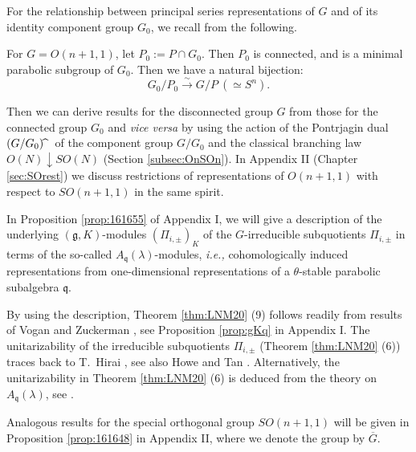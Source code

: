 For the relationship
 between principal series representations of $G$
 and of its identity component group $G_0$, 
 we recall from \cite[Chap.~5]{sbon} the following.  
\begin{lemma}
\label{lem:GPconn}
For $G=O(n+1,1)$, 
 let $P_0:=P \cap G_0$.  
Then $P_0$ is connected, 
 and is a minimal parabolic subgroup of $G_0$.  
Then we have a natural bijection:
\[
G_0/P_0 \overset \sim \to G/P \ 
(\simeq S^n).  
\]
\end{lemma}
Then we can derive results
 for the disconnected group $G$ from those for the connected group $G_0$
 and {\it{vice versa}}
 by using the action of the Pontrjagin dual $(G/G_0)\hspace{-1mm}{\widehat{\hphantom{m}}}$
 of the component group $G/G_0$
 and the classical branching law
 $O(N) \downarrow SO(N)$
 (Section \ref{subsec:OnSOn}).  
In Appendix II (Chapter \ref{sec:SOrest}) 
 we discuss restrictions
 of representations of $O(n+1,1)$
 with respect to $SO(n+1,1)$
 in the same spirit.  



In Proposition \ref{prop:161655} of Appendix I, 
 we will give a description
 of the underlying $({\mathfrak{g}},K)$-modules $(\Pi_{i,\pm})_K$
 of the $G$-irreducible subquotients $\Pi_{i,\pm}$
 in terms of the so-called 
$A_{\mathfrak{q}}(\lambda)$-modules,
 {\it{i.e.,}} cohomologically induced representations from 
 one-dimensional representations
 of a $\theta$-stable parabolic subalgebra ${\mathfrak{q}}$.  



By using the description,
 Theorem \ref{thm:LNM20} (9) follows readily from 
 results of Vogan and Zuckerman \cite{VZ}, 
 see Proposition \ref{prop:gKq} in Appendix I.  
The unitarizability of the irreducible subquotients
 $\Pi_{i,\pm}$
 (Theorem \ref{thm:LNM20} (6)) traces
 back to T.~Hirai \cite{Hirai62}, 
 see also Howe and Tan \cite{HT93}.  
Alternatively,
 the unitarizability in Theorem \ref{thm:LNM20} (6)
 is deduced from the theory
 on $A_{\mathfrak{q}}(\lambda)$, 
 see \cite[Thm.~0.51]{KV}.  



\begin{remark}
Analogous results for the special orthogonal group $SO(n+1,1)$
 will be given in Proposition \ref{prop:161648}
 in Appendix II, 
 where we denote the group by $\overline G$.  
\end{remark}



